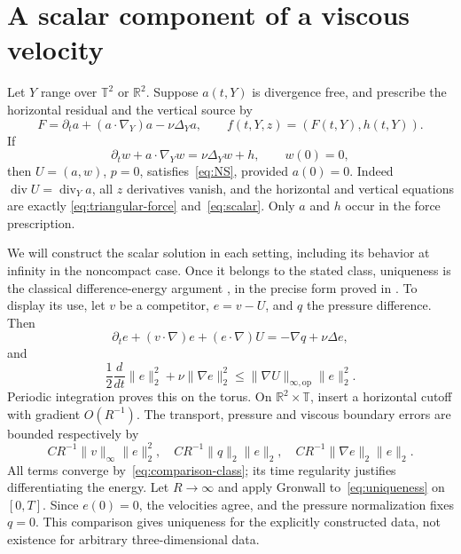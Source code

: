 \documentclass[11pt]{article}
\theoremstyle{definition}
\theoremstyle{remark}
\newcommand{\R}{\mathbb R}
\newcommand{\T}{\mathbb T}
\DeclareMathOperator{\diver}{div}
\begin{document}
\section{A scalar component of a viscous velocity}\label{sec:scalar-structure}

Let $Y$ range over $\T^2$ or $\R^2$. Suppose $a(t,Y)$ is divergence
free, and prescribe the horizontal residual and the vertical source by
\begin{equation}\label{eq:triangular-force}
 F=\partial_ta+(a\cdot\nabla_Y)a-\nu\Delta_Ya,
 \qquad f(t,Y,z)=(F(t,Y),h(t,Y)).
\end{equation}
If
\begin{equation}\label{eq:scalar}
 \partial_tw+a\cdot\nabla_Yw=\nu\Delta_Yw+h,
 \qquad w(0)=0,
\end{equation}
then $U=(a,w)$, $p=0$, satisfies~\eqref{eq:NS}, provided $a(0)=0$.
Indeed $\diver U=\diver_Ya$, all $z$ derivatives vanish, and the
horizontal and vertical equations are exactly
\eqref{eq:triangular-force} and~\eqref{eq:scalar}.
Only $a$ and $h$ occur in the force prescription.

We will construct the scalar solution in each setting, including its
behavior at infinity in the noncompact case. Once it belongs to the
stated class, uniqueness is the classical difference-energy argument
\cite[Section~18]{Leray1934}, in the precise form proved in
\cite[Lemma~3]{entry2026}. To display its use, let $v$ be a competitor,
$e=v-U$, and $q$ the pressure difference. Then
\[
 \partial_te+(v\cdot\nabla)e+(e\cdot\nabla)U
       =-\nabla q+\nu\Delta e,
\]
and
\begin{equation}\label{eq:uniqueness}
 \frac12\frac{d}{dt}\|e\|_2^2+\nu\|\nabla e\|_2^2
       \le\|\nabla U\|_{\infty,\mathrm{op}}\|e\|_2^2.
\end{equation}
Periodic integration proves this on the torus. On $\R^2\times\T$,
insert a horizontal cutoff with gradient $O(R^{-1})$. The transport,
pressure and viscous boundary errors are bounded respectively by
\[
 C R^{-1}\|v\|_\infty\|e\|_2^2,\quad
 C R^{-1}\|q\|_2\|e\|_2,\quad
 C R^{-1}\|\nabla e\|_2\|e\|_2.
\]
All terms converge by~\eqref{eq:comparison-class}; its time regularity
justifies differentiating the energy. Let $R\to\infty$ and apply
Gronwall to~\eqref{eq:uniqueness} on $[0,T]$. Since $e(0)=0$, the
velocities agree, and the pressure normalization fixes $q=0$.
This comparison gives uniqueness for the explicitly constructed data,
not existence for arbitrary three-dimensional data.



\end{document}

